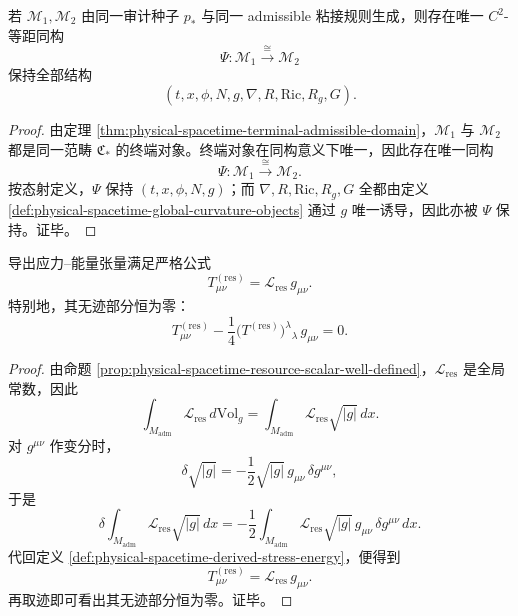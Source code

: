 \begin{corollary}\label{cor:physical-spacetime-maximal-domain-uniqueness}
若 \(\mathcal M_1,\mathcal M_2\) 由同一审计种子 \(p_\ast\) 与同一 admissible 粘接规则生成，则存在唯一 \(C^2\)-等距同构
\[
\Psi:\mathcal M_1\xrightarrow{\cong}\mathcal M_2
\]
保持全部结构
\[
(t,x,\phi,N,g,\nabla,R,\mathrm{Ric},R_g,G).
\]
\end{corollary}
\begin{proof}
由定理 \ref{thm:physical-spacetime-terminal-admissible-domain}，\(\mathcal M_1\) 与 \(\mathcal M_2\) 都是同一范畴 \(\mathfrak C_\ast\) 的终端对象。终端对象在同构意义下唯一，因此存在唯一同构
\[
\Psi:\mathcal M_1\xrightarrow{\cong}\mathcal M_2.
\]
按态射定义，\(\Psi\) 保持 \((t,x,\phi,N,g)\)；而 \(\nabla,R,\mathrm{Ric},R_g,G\) 全都由定义 \ref{def:physical-spacetime-global-curvature-objects} 通过 \(g\) 唯一诱导，因此亦被 \(\Psi\) 保持。证毕。
\end{proof}

\begin{theorem}[资源应力的纯迹化]\label{thm:physical-spacetime-resource-stress-energy-pure-trace}
导出应力--能量张量满足严格公式
\[
T^{(\mathrm{res})}_{\mu\nu}=\mathcal L_{\mathrm{res}}\,g_{\mu\nu}.
\]
特别地，其无迹部分恒为零：
\[
T^{(\mathrm{res})}_{\mu\nu}
-\frac14\bigl(T^{(\mathrm{res})}\bigr)^\lambda{}_\lambda\,g_{\mu\nu}=0.
\]
\end{theorem}
\begin{proof}
由命题 \ref{prop:physical-spacetime-resource-scalar-well-defined}，\(\mathcal L_{\mathrm{res}}\) 是全局常数，因此
\[
\int_{M_{\mathrm{adm}}}\mathcal L_{\mathrm{res}}\,d\mathrm{Vol}_g
=
\int_{M_{\mathrm{adm}}}\mathcal L_{\mathrm{res}}\sqrt{\lvert g\rvert}\,dx.
\]
对 \(g^{\mu\nu}\) 作变分时，
\[
\delta\sqrt{\lvert g\rvert}
=-\frac12\sqrt{\lvert g\rvert}\,g_{\mu\nu}\,\delta g^{\mu\nu},
\]
于是
\[
\delta\!\int_{M_{\mathrm{adm}}}\mathcal L_{\mathrm{res}}\sqrt{\lvert g\rvert}\,dx
=
-\frac12
\int_{M_{\mathrm{adm}}}\mathcal L_{\mathrm{res}}\sqrt{\lvert g\rvert}\,g_{\mu\nu}\,\delta g^{\mu\nu}\,dx.
\]
代回定义 \ref{def:physical-spacetime-derived-stress-energy}，便得到
\[
T^{(\mathrm{res})}_{\mu\nu}=\mathcal L_{\mathrm{res}}\,g_{\mu\nu}.
\]
再取迹即可看出其无迹部分恒为零。证毕。
\end{proof}

